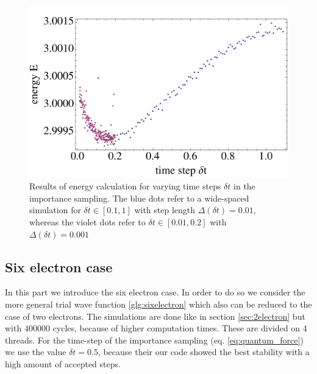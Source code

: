 \begin{figure}[htbp]
    \centering
    \includegraphics[scale=0.6]{importance}
    \caption{Results of energy calculation for varying time steps $\delta t$ in the importance sampling. The blue dots refer to a wide-spaced simulation for $\delta t \in [0.1,1]$ with step length $\Delta (\delta t) = 0.01$, whereas the violet dots refer to $\delta t\in [0.01,0.2]$ with $\Delta(\delta t) = 0.001$}
    \label{fig:importance}
\end{figure}
\FloatBarrier


\subsection{Six electron case}\label{sec:6electron}
In this part we introduce the six electron case. In order to do so we consider the more general trial wave function \ref{glg:sixelectron} which also can be reduced to the case of two electrons. The simulations are done like in section \ref{sec:2electron} but with $400000$ cycles, because of higher computation times. These are divided on 4 threads. For the time-step of the importance sampling (eq. \ref{eq:quantum_force}) we use the value $\delta t = 0.5$, because their our code showed the best stability with a high amount of accepted steps.

